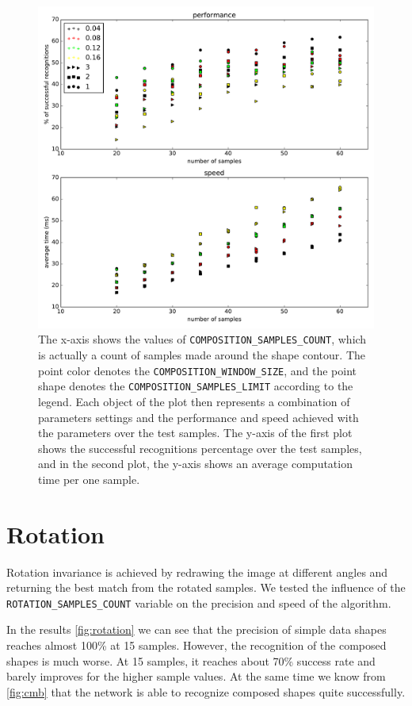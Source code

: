 \begin{figure}
\centering
\includegraphics[width=.8\linewidth]{ext/figure_composition_results.pdf}
\caption{The x-axis shows the values of \texttt{COMPOSITION\_SAMPLES\_COUNT}, which is actually a count of samples made around the shape contour. The point color denotes the \texttt{COMPOSITION\_WINDOW\_SIZE}, and the point shape denotes the \texttt{COMPOSITION\_SAMPLES\_LIMIT} according to the legend. Each object of the plot then represents a combination of parameters settings and the performance and speed achieved with the parameters over the test samples. The y-axis of the first plot shows the successful recognitions percentage over the test samples, and in the second plot, the y-axis shows an average computation time per one sample.}
\label{fig:com}
\end{figure}

\section{Rotation}
Rotation invariance is achieved by redrawing the image at different angles and returning the best match from the rotated samples. We tested the influence of the \texttt{ROTATION\_SAMPLES\_COUNT} variable on the precision and speed of the algorithm. 

In the results \cref{fig:rotation} we can see that the precision of simple data shapes reaches almost 100\% at 15 samples. However, the recognition of the composed shapes is much worse. At 15 samples, it reaches about 70\% success rate and barely improves for the higher sample values. At the same time we know from \cref{fig:cmb} that the network is able to recognize composed shapes quite successfully. 

